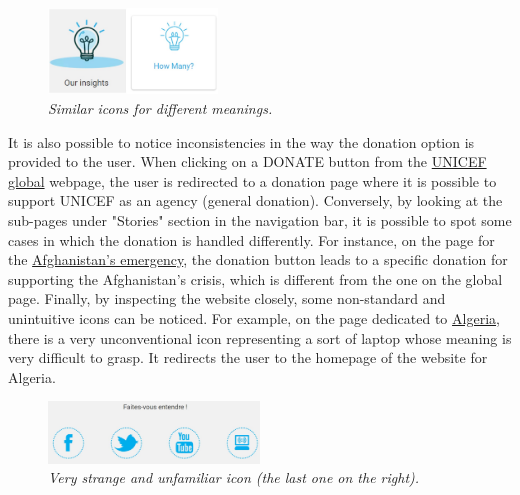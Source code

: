 \begin{figure}[!h]
	\label{fig:fig10}
	\begin{center}
		\includegraphics[width=0.4\textwidth]{FinalScores10.jpg}
		\captionsetup{font=small}
		\caption{\textit{Similar icons for different meanings.}}
	\end{center}
\end{figure}
It is also possible to notice inconsistencies in the way the donation option is provided to the user. When clicking on a DONATE button from the \href{https://www.unicef.org/}{UNICEF global} webpage, the user is redirected to a donation page where it is possible to support UNICEF as an agency (general donation). Conversely, by looking at the sub-pages under "Stories" section in the navigation bar, it is possible to spot some cases in which the donation is handled differently. For instance, on the page for the \href{https://www.unicef.org/emergencies/delivering-support-afghanistans-children}{Afghanistan's emergency}, the donation button leads to a specific donation for supporting the Afghanistan's crisis, which is different from the one on the global page.
\newline 
Finally, by inspecting the website closely, some non-standard and unintuitive icons can be noticed. For example, on the page dedicated to  \href{https://www.unicef.org/algeria/agir}{Algeria}, there is a very unconventional icon representing a sort of laptop whose meaning is very difficult to grasp. It redirects the user to the homepage of the website for Algeria.
\begin{figure}[!h]
	\begin{center}
		\includegraphics[width=0.5\textwidth]{FinalScores11.jpg}
		\captionsetup{font=small}
		\caption{\textit{Very strange and unfamiliar icon (the last one on the right).}}
	\end{center}
\end{figure}




